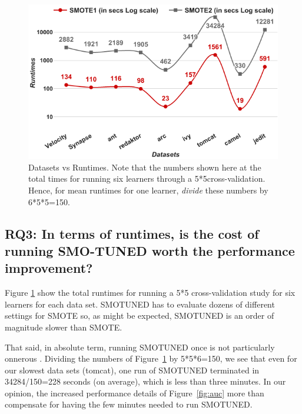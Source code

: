 \documentclass[10pt,conference]{IEEEtran}
\theoremstyle{break}
\theoremstyle{break}
\begin{document}
\begin{figure}[!htbp]
  \captionsetup{justification=centering}
                                                   \includegraphics[width=\linewidth]{./fig/runtimes.png}
  \caption{Datasets vs Runtimes. Note that the numbers
  shown here at the total times for running six learners through a 5*5cross-validation. Hence, for mean
  runtimes for one learner, {\em divide} these numbers by 6*5*5=150.}
  \label{runtime}
\vspace{-0.7cm}
\end{figure}


\subsection{{\bf RQ3:} In  terms  of  runtimes,  is  the  cost  of  running  SMO-TUNED worth the performance improvement?}

Figure \ref{runtime} show the total runtimes
for running a 5*5 cross-validation study for six learners for each data set.  
SMOTUNED has to evaluate
dozens of different settings for SMOTE
so, as might be expected,  SMOTUNED is an order of magnitude slower than SMOTE. 

That said, in absolute term, running SMOTUNED once is not particularly onnerous . Dividing the numbers of
Figure~\ref{runtime} by 5*5*6=150, we see that even for our slowest data sets (tomcat), one run
of SMOTUNED terminated in 34284/150=228 seconds (on average), which is less than three minutes. In our opinion, the increased performance details of Figure~\ref{fig:auc} more than compensate for having the few minutes needed to run SMOTUNED.
\end{document}
